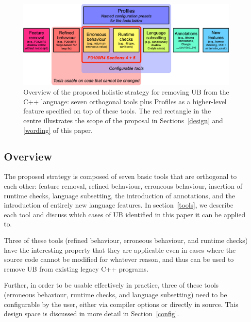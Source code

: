 \vspace{3mm}
\begin{figure}[h]
\begin{center}
\includegraphics[scale=0.256]{images/p3100_magicslide.png}
\end{center}
\caption{Overview of the proposed holistic strategy for removing UB from the C++ language: seven orthogonal tools plus Profiles as a higher-level feature specified on top of these tools. The red rectangle in the centre illustrates the scope of the proposal in Sections~\ref{design} and \ref{wording} of this paper.}
\label{fig_magicslide}
\end{figure}

\subsection{Overview}

The proposed strategy is composed of seven basic tools that are orthogonal to each other: feature removal, refined behaviour, erroneous behaviour, insertion of runtime checks, language subsetting, the introduction of annotations, and the introduction of entirely new language features. In section~\ref{tools}, we describe each tool and discuss which cases of UB identified in this paper it can be applied to.

Three of these tools (refined behaviour, erroneous behaviour, and runtime checks) have the interesting property that they are applicable even in cases where the source code cannot be modified for whatever reason, and thus can be used to remove UB from existing legacy C++ programs.

Further, in order to be usable effectively in practice, three of these tools (erroneous behaviour, runtime checks, and language subsetting) need to be configurable by the user, either via compiler options or directly in source. This design space is discussed in more detail in Section~\ref{config}.

